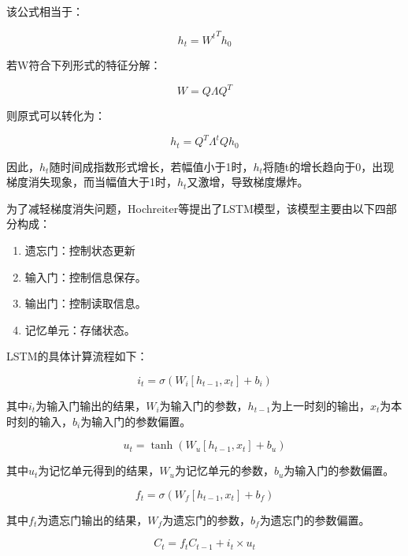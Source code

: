 该公式相当于：


\begin{equation}
h_t = {W^t}^Th_0
\end{equation}


若W符合下列形式的特征分解：


\begin{equation}
W=Q\Lambda Q^T
\end{equation}


则原式可以转化为：


\begin{equation}
h_t = Q^T\Lambda ^t Qh_0
\end{equation}


因此，$h_t$随时间成指数形式增长，若幅值小于1时，$h_t$将随t的增长趋向于0，出现梯度消失现象，而当幅值大于1时，$h_t$又激增，导致梯度爆炸。\par
为了减轻梯度消失问题，Hochreiter等\cite{lstm1997}提出了LSTM模型，该模型主要由以下四部分构成：


\begin{enumerate}
\item 遗忘门：控制状态更新
\item 输入门：控制信息保存。
\item 输出门：控制读取信息。
\item 记忆单元：存储状态。
\end{enumerate}


LSTM的具体计算流程如下：


\begin{equation}
i_t = \sigma(W_i  [h_{t-1},x_t] + b_i)
\end{equation}


其中$i_t$为输入门输出的结果，$W_i$为输入门的参数，$h_{t-1}$为上一时刻的输出，$x_t$为本时刻的输入，$b_i$为输入门的参数偏置。


\begin{equation}
u_t = \tanh{(W_u [h_{t-1},x_t] + b_u)}
\end{equation}


其中$u_t$为记忆单元得到的结果，$W_u$为记忆单元的参数，$b_u$为输入门的参数偏置。


\begin{equation}
f_t = \sigma{(W_f [h_{t-1},x_t] + b_f)}
\end{equation}


其中$f_t$为遗忘门输出的结果，$W_f$为遗忘门的参数，$b_f$为遗忘门的参数偏置。


\begin{equation}
C_t = f_t C_{t-1} + i_t \times u_t
\end{equation}


